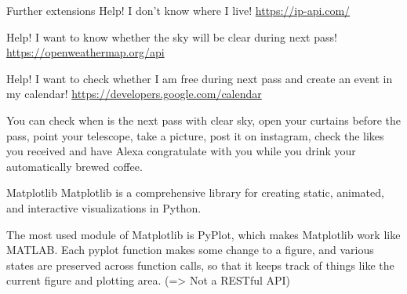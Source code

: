 \documentclass[aspectratio=169,handout]{beamer}
\begin{document}
\begin{frame}{Further extensions}
    Help! I don't know where I live! \pause \url{https://ip-api.com/}

    Help! I want to know whether the sky will be clear during next pass! \pause \url{https://openweathermap.org/api}

    Help! I want to check whether I am free during next pass and create an event in my calendar! \pause
    \url{https://developers.google.com/calendar}

    \pause
    You can check when is the next pass with clear sky, open your curtains before the
    pass, point your telescope, take a picture, post it on instagram, check the likes you received and have Alexa
    congratulate with you while you drink your automatically brewed coffee.
\end{frame}

\begin{frame}{Matplotlib}
    Matplotlib is a comprehensive library for creating static, animated, and interactive visualizations in Python.

    \pause
    The most used module of Matplotlib is PyPlot, which makes Matplotlib work like MATLAB.
    Each pyplot function makes some change to a figure, and various states are preserved across function calls, so that
    it keeps track of things like the current figure and plotting area. (=> Not a RESTful API)
\end{frame}
\end{document}

